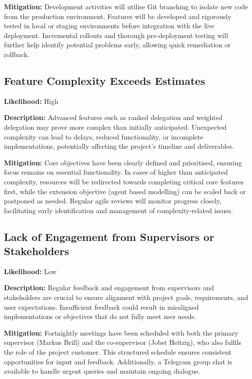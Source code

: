 \textbf{Mitigation:} Development activities will utilise Git branching to isolate new code from the production environment. Features will be developed and rigorously tested in local or staging environments before integration with the live deployment. Incremental rollouts and thorough pre-deployment testing will further help identify potential problems early, allowing quick remediation or rollback.

\subsection*{Feature Complexity Exceeds Estimates}

\textbf{Likelihood:} High

\textbf{Description:} Advanced features such as ranked delegation and weighted delegation may prove more complex than initially anticipated. Unexpected complexity can lead to delays, reduced functionality, or incomplete implementations, potentially affecting the project's timeline and deliverables.

\textbf{Mitigation:} Core objectives have been clearly defined and prioritised, ensuring focus remains on essential functionality. In cases of higher than anticipated complexity, resources will be redirected towards completing critical core features first, while the extension objective (agent based modelling) can be scaled back or postponed as needed. Regular agile reviews will monitor progress closely, facilitating early identification and management of complexity-related issues.

\subsection*{Lack of Engagement from Supervisors or Stakeholders}

\textbf{Likelihood:} Low

\textbf{Description:} Regular feedback and engagement from supervisors and stakeholders are crucial to ensure alignment with project goals, requirements, and user expectations. Insufficient feedback could result in misaligned implementations or objectives that do not fully meet user needs.

\textbf{Mitigation:} Fortnightly meetings have been scheduled with both the primary supervisor (Markus Brill) and the co-supervisor (Jobst Heitzig), who also fulfils the role of the project customer. This structured schedule ensures consistent opportunities for input and feedback. Additionally, a Telegram group chat is available to handle urgent queries and maintain ongoing dialogue.

